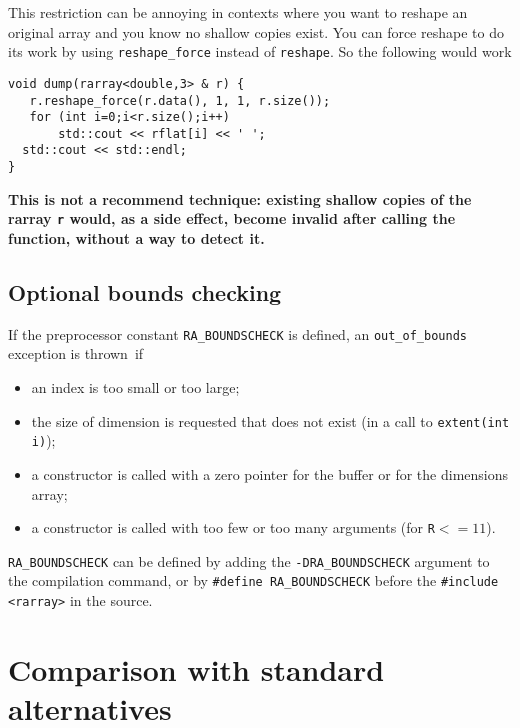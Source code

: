\documentclass[11pt,twoside]{article}
\begin{document}
This restriction can be annoying in contexts where you want to
reshape an original array and you know no shallow copies exist.  You can force
reshape to do its work by using \texttt{reshape\_force} instead of \texttt{reshape}. So the following would work
\vspace{-9pt}
\begin{framed}\vspace{-18pt}%
\begin{verbatim}
void dump(rarray<double,3> & r) {
   r.reshape_force(r.data(), 1, 1, r.size());
   for (int i=0;i<r.size();i++)
       std::cout << rflat[i] << ' ';
  std::cout << std::endl;
}
\end{verbatim}%
\vspace{-12pt}
\end{framed}\vspace{-8pt}
\textbf{This is not a recommend technique: existing shallow copies of the rarray \texttt{r} would, as a side effect, become invalid after calling the function, without a way to detect it.}


\subsection{Optional bounds checking}

If the preprocessor constant \texttt{{\tt RA\_BOUNDSCHECK}} is defined, an
\texttt{out\_of\_bounds} exception is thrown~if
\begin{itemize}\itemsep0pt\parskip3pt
\item an index is too small or too large;
\item the size of dimension is requested that does not exist (in a call to \texttt{extent(int i)});
\item a constructor is called with a zero pointer for the buffer or for the dimensions array;
\item a constructor is called with too few or too many arguments (for \texttt{R}$<=11$).
\end{itemize}
\texttt{{\tt RA\_BOUNDSCHECK}} can be defined by
adding the {\tt -DRA\_BOUNDSCHECK} argument to the compilation command, or
by \texttt{{\tt\#define RA\_BOUNDSCHECK}} before
the \texttt{{\tt\#include <rarray>}} in the source.

\pagebreak

\section{Comparison with standard alternatives}
\end{document}
